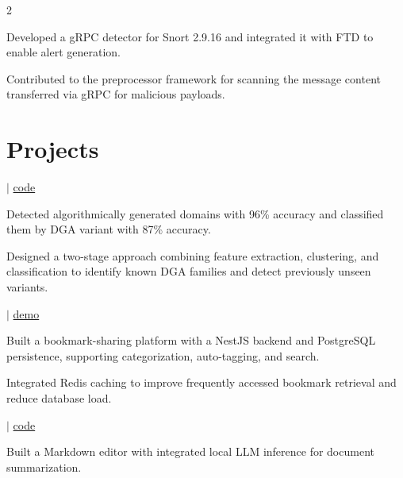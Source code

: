 \documentclass[]{hieudo-build}
\begin{document}
\begin{paracol}{2}
\begin{tightemize}
 \item Developed a gRPC detector for Snort 2.9.16 and integrated it with FTD to enable alert generation.
 \item Contributed to the preprocessor framework for scanning the message content transferred via gRPC for malicious payloads.
\end{tightemize}
\sectionsep

\section{Projects}

 $|$ \href{https://github.com/Vikramadtya/DGA-Detector}{code}

\begin{tightemize}
\item Detected algorithmically generated domains with 96\% accuracy and classified them by DGA variant with 87\% accuracy.
\item Designed a two-stage approach combining feature extraction, clustering, and classification to identify known DGA families and detect previously unseen variants.
\end{tightemize}
\sectionsep

 $|$ \href{https://bookmarker-theta-three.vercel.app}{demo}

\begin{tightemize}
\item Built a bookmark-sharing platform with a NestJS backend and PostgreSQL persistence, supporting categorization, auto-tagging, and search.
\item Integrated Redis caching to improve frequently accessed bookmark retrieval and reduce database load.
\end{tightemize}
\sectionsep 

 $|$ \href{https://github.com/Vikramadtya/Meditor}{code}

\begin{tightemize}
\item Built a Markdown editor with integrated local LLM inference for document summarization.
\end{tightemize}
\sectionsep 


\end{paracol}
\end{document}
